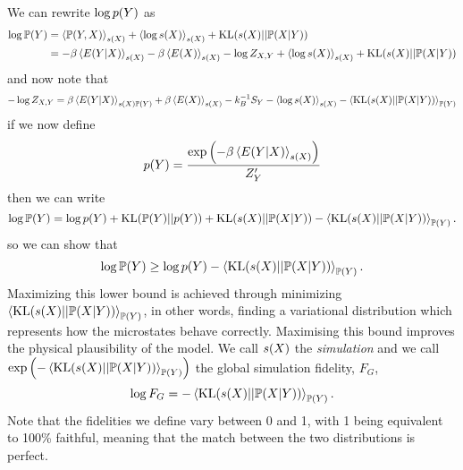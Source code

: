 \documentclass[]{article}
\begin{document}
We can rewrite $\log p(Y)$ as
\begin{align}
    \log \mathbb{P}(Y) & =
    \left\langle \mathbb{P}(Y,
      X) \right\rangle_{s(X )} + \left\langle \log
      s(X) \right\rangle_{s(X)} +
    \text{KL}(s(X)||\mathbb{P}(X|Y))
    \nonumber \\ & = -\beta\left\langle  E(Y |
      X) \right\rangle_{s(X)}
    -\beta\left\langle E(X) \right\rangle_{s(X)} -
    \log Z_{X,Y} + \left\langle \log
      s(X) \right\rangle_{s(X)} +
    \text{KL}(s(X)||\mathbb{P}(X|Y)) \label{eqn-true-log-likelihood-1}
\end{align}
and now note that
\[
- \log Z_{X,Y} =
\beta\left\langle E(Y |
  X) \right\rangle_{s(X)\mathbb{P}(Y)}
+ \beta\left\langle E(X) \right\rangle_{s(X )} -
k_B^{-1}S_Y -\left\langle \log
  s(X) \right\rangle_{s(X)} -
\left\langle \text{KL}(s(X) ||
  \mathbb{P}(X |
  Y)) \right\rangle_{\mathbb{P}(Y)}
\]
if we now define
\[
p(Y) = \frac{\exp\left(-\beta
  \left\langle E(Y |
    X) \right\rangle_{s(X)}\right)}{Z^\prime_Y}
\]
then we can write
\[
\log \mathbb{P}(Y) = \log p(Y) +
\text{KL}(\mathbb{P}(Y)||p(Y)) +
\text{KL}(s(X)||\mathbb{P}(X|Y))
-
\left\langle \text{KL}(s(X)||\mathbb{P}(X|Y)) \right\rangle_{\mathbb{P}(Y)}.
\]
so we can show that
\[
\log \mathbb{P}(Y) \geq \log p(Y)
-
\left\langle \text{KL}(s(X)||\mathbb{P}(X|Y)) \right\rangle_{\mathbb{P}(Y)}.
\]
Maximizing this lower bound is achieved through minimizing
$\left\langle \text{KL}(s(X)||\mathbb{P}(X|Y)) \right\rangle_{\mathbb{P}(Y)}$,
in other words, finding a variational distribution which represents
how the microstates behave correctly. Maximising this bound improves
the physical plausibility of the model. We call
$s(X)$ the \emph{simulation} and we call
$\exp\left(-
\left\langle \text{KL}(s(X)||\mathbb{P}(X|Y)) \right\rangle_{\mathbb{P}(Y)}\right)$
the global simulation fidelity, $F_G$,
\[
\log F_G =
-\left\langle \text{KL}(s(X)||\mathbb{P}(X|Y)) \right\rangle_{\mathbb{P}(Y)}.
\]
Note that the fidelities we define vary between 0 and 1, with 1 being
equivalent to 100\% faithful, meaning that the match between the two
distributions is perfect.
\end{document}

